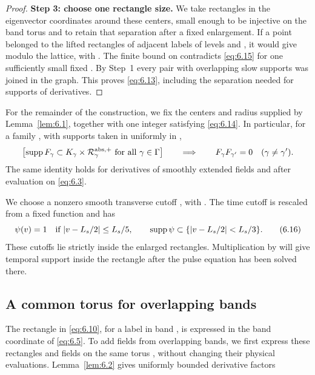 \begin{proof}
\textbf{Step 3: choose one rectangle size.} We take rectangles in the eigenvector coordinates around these centers, small enough to be injective on the band torus and to retain that separation after a fixed enlargement. If a point belonged to the lifted rectangles of adjacent labels of levels  and , it would give  modulo the lattice, with . The finite bound on  contradicts \eqref{eq:6.15} for one sufficiently small fixed . By Step~1 every pair with overlapping slow supports was joined in the graph. This proves \eqref{eq:6.13}, including the separation needed for supports of derivatives.
\end{proof}

For the remainder of the construction, we fix the centers  and radius  supplied by Lemma~\ref{lem:6.1}, together with one integer  satisfying \eqref{eq:6.14}. In particular, for a family , with supports taken in  uniformly in ,
\[
 \bigl[\operatorname{supp} F_\gamma\subset K_\gamma\times\mathcal R_\gamma^{\mathrm{abs},+}
 \text{ for all }\gamma\in\Gamma\bigr]
 \qquad\Longrightarrow\qquad
 F_\gamma F_{\gamma'}=0
 \quad(\gamma\ne\gamma').
\]
The same identity holds for derivatives of smoothly extended fields and after evaluation on \eqref{eq:6.3}.

We choose a nonzero smooth transverse cutoff , with . The time cutoff  is rescaled from a fixed function and has
\begin{equation}
 \psi(v)=1\quad\text{if }|v-L_s/2|\le L_s/5,
 \qquad
 \operatorname{supp}\psi\subset\{|v-L_s/2|<L_s/3\}.
 \tag{6.16}\label{eq:6.16}
\end{equation}
These cutoffs lie strictly inside the enlarged rectangles. Multiplication by  will give temporal support inside the rectangle after the pulse equation has been solved there.

\subsection{A common torus for overlapping bands}\label{sec:6.3}

The rectangle  in \eqref{eq:6.10}, for a label in band , is expressed in the band coordinate  of \eqref{eq:6.5}. To add fields from overlapping bands, we first express these rectangles and fields on the same torus , without changing their physical evaluations. Lemma~\ref{lem:6.2} gives uniformly bounded derivative factors
